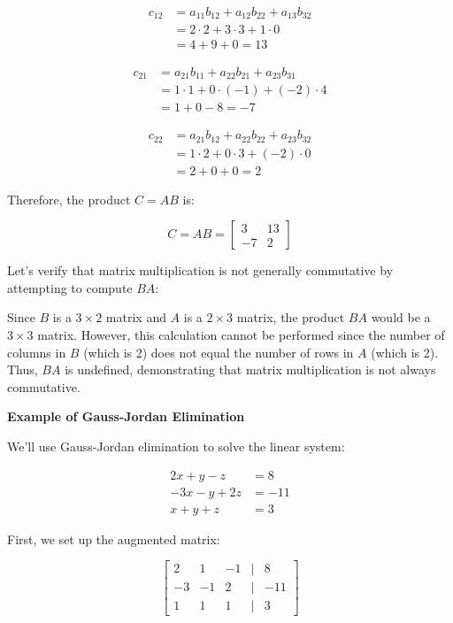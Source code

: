 \begin{align*}
    c_{12} &= a_{11}b_{12} + a_{12}b_{22} + a_{13}b_{32} \\
    &= 2 \cdot 2 + 3 \cdot 3 + 1 \cdot 0 \\
    &= 4 + 9 + 0 = 13
\end{align*}

\begin{align*}
    c_{21} &= a_{21}b_{11} + a_{22}b_{21} + a_{23}b_{31} \\
    &= 1 \cdot 1 + 0 \cdot (-1) + (-2) \cdot 4 \\
    &= 1 + 0 - 8 = -7
\end{align*}

\begin{align*}
    c_{22} &= a_{21}b_{12} + a_{22}b_{22} + a_{23}b_{32} \\
    &= 1 \cdot 2 + 0 \cdot 3 + (-2) \cdot 0 \\
    &= 2 + 0 + 0 = 2
\end{align*}

Therefore, the product \(C = AB\) is:

\[
    C = AB = 
    \begin{bmatrix}
    3 & 13 \\
    -7 & 2
    \end{bmatrix}
\]

Let's verify that matrix multiplication is not generally commutative by attempting to compute \(BA\):

Since \(B\) is a \(3 \times 2\) matrix and \(A\) is a \(2 \times 3\) matrix, the product \(BA\) would be a \(3 \times 3\) matrix. However, this calculation cannot be performed since the number of columns in \(B\) (which is 2) does not equal the number of rows in \(A\) (which is 2). Thus, \(BA\) is undefined, demonstrating that matrix multiplication is not always commutative.

\textbf{Example of Gauss-Jordan Elimination}

We'll use Gauss-Jordan elimination to solve the linear system:

\begin{align*}
    2x + y - z &= 8 \\
    -3x - y + 2z &= -11 \\
    x + y + z &= 3
\end{align*}

First, we set up the augmented matrix:

\[
    \begin{bmatrix}
    2 & 1 & -1 & | & 8 \\
    -3 & -1 & 2 & | & -11 \\
    1 & 1 & 1 & | & 3
    \end{bmatrix}
\]

